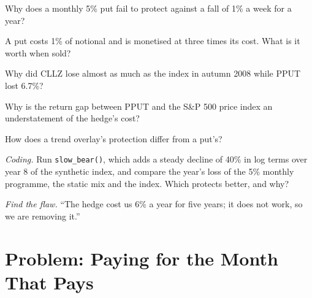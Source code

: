 \begin{exercise}[$\star$]\label{exo:s2:tail-hedging-and-long-volatility:2}
Why does a monthly 5\% put fail to protect against a fall of 1\% a week for a year?
\end{exercise}

\begin{exercise}[$\star$]\label{exo:s2:tail-hedging-and-long-volatility:3}
A put costs 1\% of notional and is monetised at three times its cost. What is it worth when sold?
\end{exercise}

\begin{exercise}[$\star\star$]\label{exo:s2:tail-hedging-and-long-volatility:4}
Why did CLLZ lose almost as much as the index in autumn 2008 while PPUT lost 6.7\%?
\end{exercise}

\begin{exercise}[$\star\star$]\label{exo:s2:tail-hedging-and-long-volatility:5}
Why is the return gap between PPUT and the S\&P 500 price index an understatement of the hedge's cost?
\end{exercise}

\begin{exercise}[$\star\star$]\label{exo:s2:tail-hedging-and-long-volatility:6}
How does a trend overlay's protection differ from a put's?
\end{exercise}

\begin{exercise}[$\star\star\star$]\label{exo:s2:tail-hedging-and-long-volatility:7}
\emph{Coding.} Run \texttt{slow\_bear()}, which adds a steady decline of 40\% in log terms over year 8 of the synthetic index, and compare the
year's loss of the 5\% monthly programme, the static mix and the index. Which protects better, and why?
\end{exercise}

\begin{exercise}[$\star\star\star$]\label{exo:s2:tail-hedging-and-long-volatility:8}
\emph{Find the flaw.} ``The hedge cost us 6\% a year for five years; it does not work, so we are removing it.''
\end{exercise}

\section{Problem: Paying for the Month That Pays}

